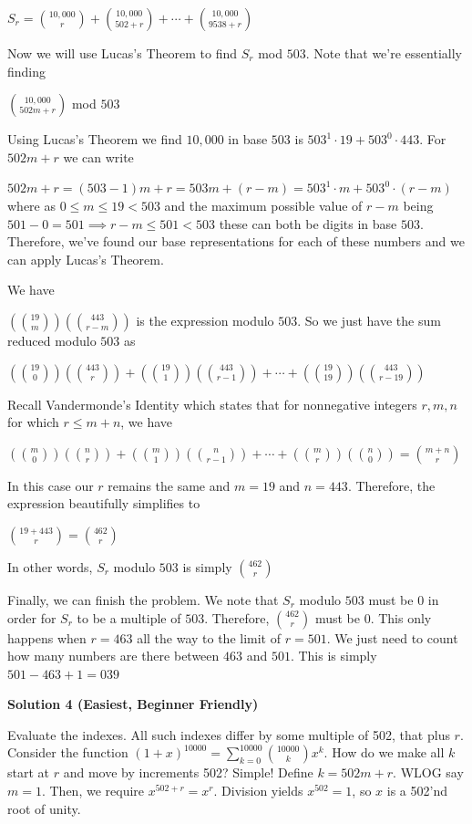 \begin{enumerate}
 $S_r = \binom{10, 000}{r} + \binom{10, 000}{502 + r} + \cdots + \binom{10,000}{9538 + r}$

 Now we will use Lucas's Theorem to find $S_r$ mod $503$. Note that we're essentially finding

 $\binom{10, 000}{502m + r}$ mod $503$

 Using Lucas's Theorem we find $10,000$ in base $503$ is $503^1 \cdot 19 + 503^0 \cdot 443$. For $502m + r$ we can write

 $502m + r = (503 - 1)m + r = 503m + (r - m) = 503^1 \cdot m + 503^0 \cdot (r - m)$ where as $0 \leq m \leq 19 < 503$ and the maximum possible value of $r - m$ being $501 - 0 = 501 \implies r - m \leq 501 < 503$ these can both be digits in base $503$. Therefore, we've found our base representations for each of these numbers and we can apply Lucas's Theorem.

 We have

 $(\binom{19}{m})(\binom{443}{r - m})$ is the expression modulo $503$. So we just have the sum reduced modulo $503$ as

 $(\binom{19}{0})(\binom{443}{r}) + (\binom{19}{1})(\binom{443}{r - 1}) + \cdots + (\binom{19}{19})(\binom{443}{r - 19})$

 Recall Vandermonde's Identity which states that for nonnegative integers $r, m, n$ for which $r \leq m + n$, we have

 $(\binom{m}{0})(\binom{n}{r}) + (\binom{m}{1})(\binom{n}{r - 1}) + \cdots + (\binom{m}{r})(\binom{n}{0}) = \binom{m + n}{r}$

 In this case our $r$ remains the same and $m = 19$ and $n = 443$. Therefore, the expression beautifully simplifies to

 $\binom{19 + 443}{r} = \binom{462}{r}$

 In other words, $S_r$ modulo $503$ is simply $\binom{462}{r}$

 Finally, we can finish the problem. We note that $S_r$ modulo $503$ must be $0$ in order for $S_r$ to be a multiple of $503$. Therefore, $\binom{462}{r}$ must be $0$. This only happens when $r = 463$ all the way to the limit of $r = 501$. We just need to count how many numbers are there between $463$ and $501$. This is simply $501 - 463 + 1 = \boxed{039}$




\textbf{Solution 4 (Easiest, Beginner Friendly)}

Evaluate the indexes. All such indexes differ by some multiple of 502, that plus $r$. Consider the function $(1+x)^{10000} = \sum_{k=0}^{10000} \binom{10000}{k}x^k$. How do we make all $k$ start at $r$ and move by increments 502? Simple! Define $k = 502m+r$. WLOG say $m=1$. Then, we require $x^{502+r} = x^{r}$. Division yields $x^{502} = 1$, so $x$ is a 502'nd root of unity.


\end{enumerate}
